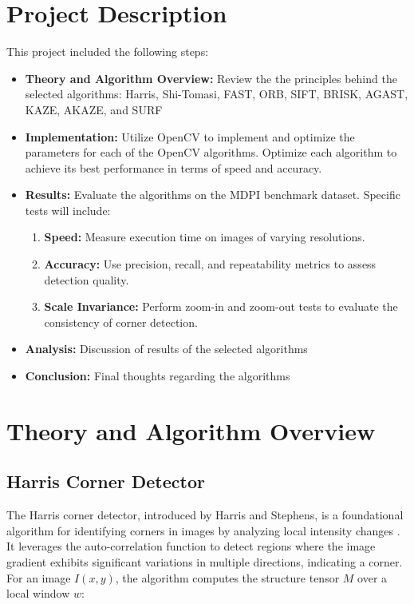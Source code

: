 \documentclass[journal]{IEEEtran}
\begin{document}
\section{Project Description}
This project included the following steps:
\begin{itemize}
    \item \textbf{Theory and Algorithm Overview:} Review the the principles behind the selected algorithms: Harris, Shi-Tomasi, FAST, ORB, SIFT, BRISK, AGAST, KAZE, AKAZE, and SURF
    \item \textbf{Implementation:} Utilize OpenCV to implement and optimize the parameters for each of the OpenCV algorithms. Optimize each algorithm to achieve its best performance in terms of speed and accuracy.
    \item \textbf{Results:} Evaluate the algorithms on the MDPI benchmark dataset. Specific tests will include:
    \begin{enumerate}
        \item \textbf{Speed:} Measure execution time on images of varying resolutions.
        \item \textbf{Accuracy:} Use precision, recall, and repeatability metrics to assess detection quality.
        \item \textbf{Scale Invariance:} Perform zoom-in and zoom-out tests to evaluate the consistency of corner detection.
    \end{enumerate}
    \item \textbf{Analysis:} Discussion of results of the selected algorithms
    \item \textbf{Conclusion:} Final thoughts regarding the algorithms
\end{itemize}


\section{Theory and Algorithm Overview}

\subsection{Harris Corner Detector}
The Harris corner detector, introduced by Harris and Stephens, is a foundational algorithm for identifying corners in images by analyzing local intensity changes \cite{Harris_Corner}. It leverages the auto-correlation function to detect regions where the image gradient exhibits significant variations in multiple directions, indicating a corner. For an image \( I(x, y) \), the algorithm computes the structure tensor \( M \) over a local window \( w \):
\end{document}
